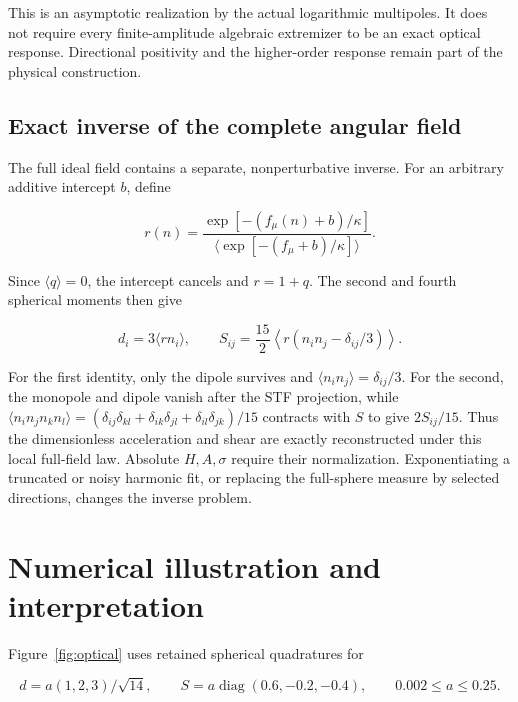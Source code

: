 \documentclass[aps,prd,reprint,onecolumn,11pt,nofootinbib,notitlepage]{revtex4-2}
\begin{document}
This is an asymptotic realization by the actual logarithmic multipoles. It does not require every finite-amplitude algebraic extremizer to be an exact optical response. Directional positivity and the higher-order response remain part of the physical construction.

\subsection{Exact inverse of the complete angular field}

The full ideal field contains a separate, nonperturbative inverse. For an arbitrary additive intercept \(b\), define

\begin{equation}
 r(n)=\frac{\exp[-(f_\mu(n)+b)/\kappa]}
             {\langle\exp[-(f_\mu+b)/\kappa]\rangle}.
 \tag{38}
\end{equation}

Since \(\langle q\rangle=0\), the intercept cancels and \(r=1+q\). The second and fourth spherical moments then give

\begin{equation}
 d_i=3\langle rn_i\rangle,\qquad
 S_{ij}=\frac{15}{2}\left\langle r
                 (n_in_j-\delta_{ij}/3)\right\rangle.
 \tag{39}
\end{equation}

For the first identity, only the dipole survives and \(\langle n_in_j\rangle=\delta_{ij}/3\). For the second, the monopole and dipole vanish after the STF projection, while \(\langle n_in_jn_kn_l\rangle=(\delta_{ij}\delta_{kl}+\delta_{ik}\delta_{jl}+\delta_{il}\delta_{jk})/15\) contracts with \(S\) to give \(2S_{ij}/15\). Thus the dimensionless acceleration and shear are exactly reconstructed under this local full-field law. Absolute \(H,A,\sigma\) require their normalization. Exponentiating a truncated or noisy harmonic fit, or replacing the full-sphere measure by selected directions, changes the inverse problem.

\section{Numerical illustration and interpretation}

Figure~\ref{fig:optical} uses retained spherical quadratures for

\begin{equation}
 d=a(1,2,3)/\sqrt{14},\qquad
 S=a\operatorname{diag}(0.6,-0.2,-0.4),\qquad
 0.002\le a\le0.25.
 \tag{40}
\end{equation}
\end{document}
